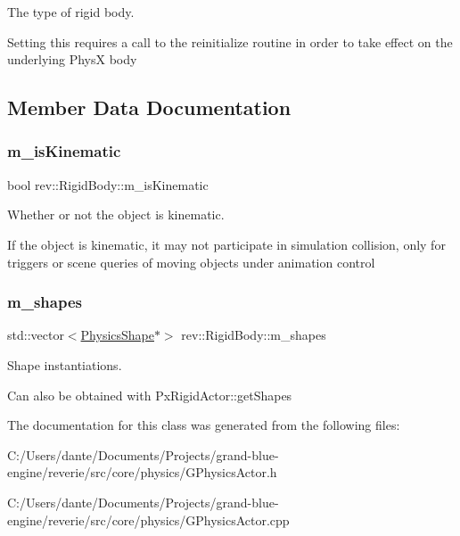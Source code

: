The type of rigid body. 

Setting this requires a call to the reinitialize routine in order to take effect on the underlying PhysX body 

\subsection{Member Data Documentation}
\mbox{\label{classrev_1_1_rigid_body_a8e4d45b9d3506659d760acf25774eea9}} 
\subsubsection{\texorpdfstring{m\_isKinematic}{m\_isKinematic}}
{\footnotesize\ttfamily bool rev\+::\+Rigid\+Body\+::m\+\_\+is\+Kinematic\hspace{0.3cm}{\ttfamily [protected]}}



Whether or not the object is kinematic. 

If the object is kinematic, it may not participate in simulation collision, only for triggers or scene queries of moving objects under animation control \mbox{\label{classrev_1_1_rigid_body_a59adf3ade36187d693f121ea7f59af9b}} 
\subsubsection{\texorpdfstring{m\_shapes}{m\_shapes}}
{\footnotesize\ttfamily std\+::vector$<$\mbox{\hyperlink{classrev_1_1_physics_shape}{Physics\+Shape}}$\ast$$>$ rev\+::\+Rigid\+Body\+::m\+\_\+shapes\hspace{0.3cm}{\ttfamily [protected]}}



Shape instantiations. 

Can also be obtained with Px\+Rigid\+Actor\+::get\+Shapes 

The documentation for this class was generated from the following files\+:\begin{DoxyCompactItemize}
\item 
C\+:/\+Users/dante/\+Documents/\+Projects/grand-\/blue-\/engine/reverie/src/core/physics/G\+Physics\+Actor.\+h\item 
C\+:/\+Users/dante/\+Documents/\+Projects/grand-\/blue-\/engine/reverie/src/core/physics/G\+Physics\+Actor.\+cpp\end{DoxyCompactItemize}
